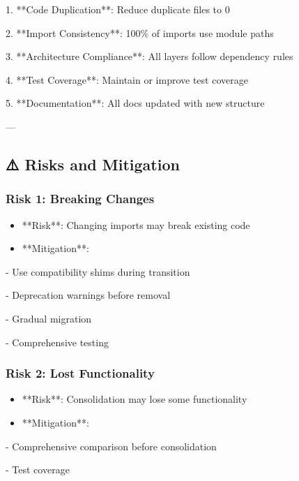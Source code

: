 \documentclass[11pt,a4paper]{article}
\begin{document}
1. **Code Duplication**: Reduce duplicate files to 0

2. **Import Consistency**: 100\% of imports use module paths

3. **Architecture Compliance**: All layers follow dependency rules

4. **Test Coverage**: Maintain or improve test coverage

5. **Documentation**: All docs updated with new structure

---

\subsection{⚠️ Risks and Mitigation}

\subsubsection{Risk 1: Breaking Changes}

\begin{itemize}
\item **Risk**: Changing imports may break existing code
\end{itemize}

\begin{itemize}
\item **Mitigation**: 
\end{itemize}

  - Use compatibility shims during transition

  - Deprecation warnings before removal

  - Gradual migration

  - Comprehensive testing

\subsubsection{Risk 2: Lost Functionality}

\begin{itemize}
\item **Risk**: Consolidation may lose some functionality
\end{itemize}

\begin{itemize}
\item **Mitigation**:
\end{itemize}

  - Comprehensive comparison before consolidation

  - Test coverage
\end{document}
